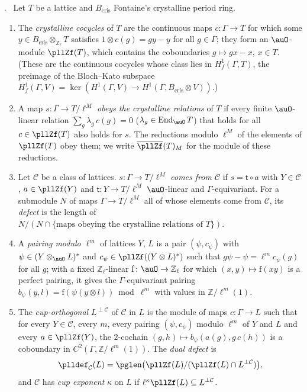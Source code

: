 \documentclass[10pt]{amsart}
\theoremstyle{definition}
\theoremstyle{remark}
\newcommand{\Z}{\mathbb Z}
\providecommand{\pllB}{B_{\mathrm{cris}}}
\providecommand{\pllperp}{\perp}
\newenvironment{quoteddef}[2]{\par\medskip\noindent\begingroup
  \textbf{#1}#2.\ \ignorespaces}{\endgroup\par\medskip}
\begin{document}
\begin{quoteddef}{\cite[Definition~5.1]{P55}}{}
Let $T$ be a lattice and $\pllB$ Fontaine's crystalline period ring.
\begin{enumerate}
\item The \emph{crystalline cocycles} of $T$ are the continuous maps $c\colon\Gamma\to T$ for which some
$y\in\pllB\otimes_{\Z_\ell}T$ satisfies $1\otimes c(g)=gy-y$ for all $g\in\Gamma$; they form an
$\auO$-module $\pllZf(T)$, which contains the coboundaries $g\mapsto gx-x$, $x\in T$. (These are
the continuous cocycles whose class lies in $H^1_f(\Gamma,T)$, the preimage of the Bloch--Kato
subspace $H^1_f(\Gamma,V)=\ker(H^1(\Gamma,V)\to H^1(\Gamma,\pllB\otimes V))$.)
\item A map $s\colon\Gamma\to T/\ell^M$ \emph{obeys the crystalline relations} of $T$ if every
finite $\auO$-linear relation $\sum_g\lambda_g\,c(g)=0$ ($\lambda_g\in\operatorname{End}_\auO T$)
that holds for all $c\in\pllZf(T)$ also holds for $s$. The reductions modulo $\ell^M$ of the
elements of $\pllZf(T)$ obey them; we write $\overline{\pllZf}(T)_M$ for the module of these
reductions.
\item Let $\mathcal C$ be a class of lattices. $s\colon\Gamma\to T/\ell^M$ \emph{comes from
$\mathcal C$} if $s=\mathsf t\circ a$ with $Y\in\mathcal C$, $a\in\pllZf(Y)$ and $\mathsf t\colon
Y\to T/\ell^M$ $\auO$-linear and $\Gamma$-equivariant. For a submodule $N$ of maps
$\Gamma\to T/\ell^M$ all of whose elements come from $\mathcal C$, its \emph{defect} is the length
of $N/(N\cap\{\text{maps obeying the crystalline relations of }T\})$.
\item A \emph{pairing modulo $\ell^m$} of lattices $Y$, $L$ is a pair $(\psi,c_\psi)$ with
$\psi\in(Y\otimes_\auO L)^*$ and $c_\psi\in\pllZf((Y\otimes L)^*)$ such that $g\psi-\psi=
\ell^mc_\psi(g)$ for all $g$; with a fixed $\Z_\ell$-linear $\mathrm{f}\colon\auO\to\Z_\ell$ for
which $(x,y)\mapsto\mathrm f(xy)$ is a perfect pairing, it gives the $\Gamma$-equivariant pairing
$b_\psi(y,l)=\mathrm f(\psi(y\otimes l))\bmod\ell^m$ with values in $\Z/\ell^m(1)$.
\item The \emph{cup-orthogonal} $L^{\pllperp\mathcal C}$ of $\mathcal C$ in $L$ is the module of
maps $c\colon\Gamma\to L$ such that for every $Y\in\mathcal C$, every $m$, every pairing
$(\psi,c_\psi)$ modulo $\ell^m$ of $Y$ and $L$ and every $a\in\pllZf(Y)$, the $2$-cochain
$(g,h)\mapsto b_\psi(a(g),g\,c(h))$ is a coboundary in $C^2(\Gamma,\Z/\ell^m(1))$. The \emph{dual
defect} is
\[
\plldef_{\mathcal C}(L)=\pglen\bigl(\pllZf(L)/(\pllZf(L)\cap L^{\pllperp\mathcal C})\bigr),
\]
and $\mathcal C$ has \emph{cup exponent} $\kappa$ on $L$ if $\ell^\kappa\pllZf(L)\subseteq L^{\pllperp
\mathcal C}$.
\end{enumerate}
\end{quoteddef}
\end{document}
